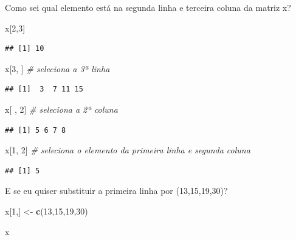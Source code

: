 \documentclass[
]{book}
\newenvironment{Shaded}{\begin{snugshade}}{\end{snugshade}}
\newcommand{\CommentTok}[1]{\textcolor[rgb]{0.56,0.35,0.01}{\textit{#1}}}
\newcommand{\DecValTok}[1]{\textcolor[rgb]{0.00,0.00,0.81}{#1}}
\newcommand{\KeywordTok}[1]{\textcolor[rgb]{0.13,0.29,0.53}{\textbf{#1}}}
\newcommand{\NormalTok}[1]{#1}
\newcommand{\StringTok}[1]{\textcolor[rgb]{0.31,0.60,0.02}{#1}}
\begin{document}
Como sei qual elemento está na segunda linha e terceira coluna da matriz x?

\begin{Shaded}
\begin{Highlighting}[]
\NormalTok{x[}\DecValTok{2}\NormalTok{,}\DecValTok{3}\NormalTok{]}
\end{Highlighting}
\end{Shaded}

\begin{verbatim}
## [1] 10
\end{verbatim}

\begin{Shaded}
\begin{Highlighting}[]
\NormalTok{x[}\DecValTok{3}\NormalTok{,  ]   }\CommentTok{# seleciona a 3ª linha}
\end{Highlighting}
\end{Shaded}

\begin{verbatim}
## [1]  3  7 11 15
\end{verbatim}

\begin{Shaded}
\begin{Highlighting}[]
\NormalTok{x[ , }\DecValTok{2}\NormalTok{]   }\CommentTok{# seleciona a 2ª coluna}
\end{Highlighting}
\end{Shaded}

\begin{verbatim}
## [1] 5 6 7 8
\end{verbatim}

\begin{Shaded}
\begin{Highlighting}[]
\NormalTok{x[}\DecValTok{1}\NormalTok{, }\DecValTok{2}\NormalTok{]   }\CommentTok{# seleciona o elemento da primeira linha e segunda coluna}
\end{Highlighting}
\end{Shaded}

\begin{verbatim}
## [1] 5
\end{verbatim}

E se eu quiser substituir a primeira linha por (13,15,19,30)?

\begin{Shaded}
\begin{Highlighting}[]
\NormalTok{x[}\DecValTok{1}\NormalTok{,] <-}\StringTok{ }\KeywordTok{c}\NormalTok{(}\DecValTok{13}\NormalTok{,}\DecValTok{15}\NormalTok{,}\DecValTok{19}\NormalTok{,}\DecValTok{30}\NormalTok{)}

\NormalTok{x}
\end{Highlighting}
\end{Shaded}
\end{document}
